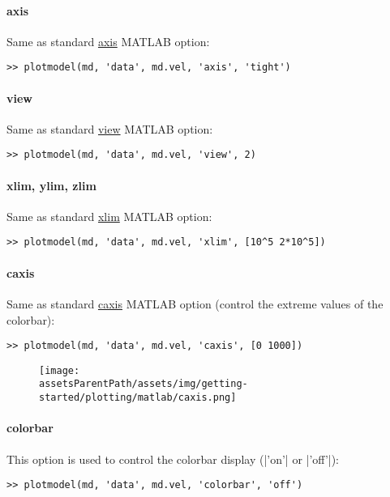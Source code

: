 \paragraph{axis}
Same as standard \href{http://www.mathworks.com/help/techdoc/ref/axis.html}{axis} MATLAB option:
\begin{lstlisting}
>> plotmodel(md, 'data', md.vel, 'axis', 'tight')
\end{lstlisting}

\paragraph{view}
Same as standard \href{http://www.mathworks.com/help/techdoc/ref/view.html}{view} MATLAB option:
\begin{lstlisting}
>> plotmodel(md, 'data', md.vel, 'view', 2)
\end{lstlisting}

\paragraph{xlim, ylim, zlim}
Same as standard \href{http://www.mathworks.com/help/techdoc/ref/xlim.html}{xlim} MATLAB option:
\begin{lstlisting}
>> plotmodel(md, 'data', md.vel, 'xlim', [10^5 2*10^5])
\end{lstlisting}

\paragraph{caxis}
Same as standard \href{http://www.mathworks.com/access/helpdesk/help/techdoc/index.html?/access/helpdesk/help/techdoc/ref/caxis.html}{caxis} MATLAB option (control the extreme values of the colorbar):
\begin{lstlisting}
>> plotmodel(md, 'data', md.vel, 'caxis', [0 1000])
\end{lstlisting}
\begin{figure}[H]
	\begin{center}
		\texttt{[image: \\assetsParentPath/assets/img/getting-started/plotting/matlab/caxis.png]}
	\end{center}
\end{figure}

\paragraph{colorbar}
This option is used to control the colorbar display (\lstinlinebg|'on'| or \lstinlinebg|'off'|):
\begin{lstlisting}
>> plotmodel(md, 'data', md.vel, 'colorbar', 'off')
\end{lstlisting}

